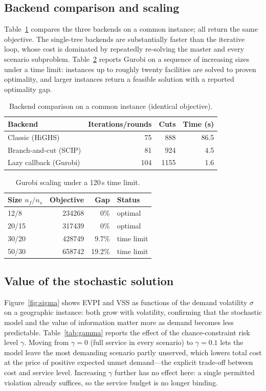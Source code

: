 \documentclass[11pt]{article}
\begin{document}
\subsection{Backend comparison and scaling}
Table~\ref{tab:backends} compares the three backends on a common instance; all
return the same objective. The single-tree backends are substantially faster than
the iterative loop, whose cost is dominated by repeatedly re-solving the master and
every scenario subproblem. Table~\ref{tab:scaling} reports Gurobi on a sequence of
increasing sizes under a time limit: instances up to roughly twenty facilities are
solved to proven optimality, and larger instances return a feasible solution with a
reported optimality gap.

\begin{table}[t]
  \centering
  \caption{Backend comparison on a common instance (identical objective).}
  \label{tab:backends}
  \begin{tabular}{lrrr}
    \toprule
    Backend & Iterations/rounds & Cuts & Time (s) \\
    \midrule
    Classic (HiGHS)        & 75  & 888  & 86.5 \\
    Branch-and-cut (SCIP)  & 81  & 924  & 4.5  \\
    Lazy callback (Gurobi) & 104 & 1155 & 1.6  \\
    \bottomrule
  \end{tabular}
\end{table}

\begin{table}[t]
  \centering
  \caption{Gurobi scaling under a 120\,s time limit.}
  \label{tab:scaling}
  \begin{tabular}{lrrl}
    \toprule
    Size $n_f/n_s$ & Objective & Gap & Status \\
    \midrule
    12/8  & 234268  & 0\%    & optimal \\
    20/15 & 317439  & 0\%    & optimal \\
    30/20 & 428749  & 9.7\%  & time limit \\
    50/30 & 658742  & 19.2\% & time limit \\
    \bottomrule
  \end{tabular}
\end{table}

\subsection{Value of the stochastic solution}
Figure~\ref{fig:sigma} shows EVPI and VSS as functions of the demand volatility
$\sigma$ on a geographic instance: both grow with volatility, confirming that the
stochastic model and the value of information matter more as demand becomes less
predictable. Table~\ref{tab:gamma} reports the effect of the chance-constraint risk
level $\gamma$. Moving from $\gamma=0$ (full service in every scenario) to
$\gamma=0.1$ lets the model leave the most demanding scenario partly unserved,
which lowers total cost at the price of positive expected unmet demand---the
explicit trade-off between cost and service level. Increasing $\gamma$ further has
no effect here: a single permitted violation already suffices, so the service
budget is no longer binding.
\end{document}
